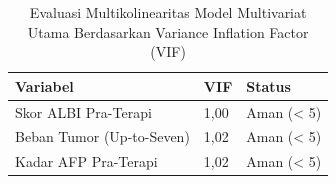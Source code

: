 \documentclass[
  indonesian,
]{report}
\begin{document}
{

\begin{longtable}[]{@{}lll@{}}

\caption{\label{tbl-vif}Evaluasi Multikolinearitas Model Multivariat
Utama Berdasarkan Variance Inflation Factor (VIF)}

\tabularnewline

\toprule\noalign{}
Variabel & VIF & Status \\
\midrule\noalign{}
\endhead
\bottomrule\noalign{}
\endlastfoot
Skor ALBI Pra-Terapi & 1,00 & Aman (\textless{} 5) \\
Beban Tumor (Up-to-Seven) & 1,02 & Aman (\textless{} 5) \\
Kadar AFP Pra-Terapi & 1,02 & Aman (\textless{} 5) \\

\end{longtable}

}
\end{document}
